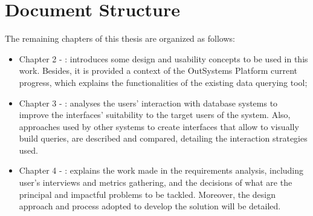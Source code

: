 \section{Document Structure}
\label{sec:document_structure}

The remaining chapters of this thesis are organized as follows:

\begin{itemize}
  \item Chapter 2 - : introduces some design and usability concepts to be used in this work. Besides, it is provided a context of the OutSystems Platform current progress, which explains the functionalities of the existing data querying tool;
  \item Chapter 3 - : analyses the users' interaction with database systems to improve the interfaces' suitability to the target users of the system. Also, approaches used by other systems to create interfaces that allow to visually build queries, are described and compared, detailing the interaction strategies used.
  \item Chapter 4 - : explains the work made in the requirements analysis, including user's interviews and metrics gathering, and the decisions of what are the principal and impactful problems to be tackled. Moreover, the design approach and process adopted to develop the solution will be detailed.
\end{itemize}
